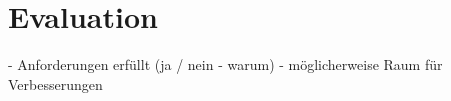 \chapter{Evaluation}
\label{ch:Evaluation}

- Anforderungen erfüllt (ja / nein - warum)
-  möglicherweise Raum für Verbesserungen
